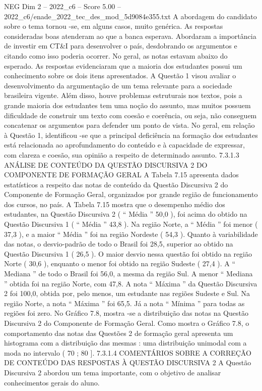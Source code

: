 \begin{textsample}{NEG Dim 2 – 2022\_c6 – Score 5.00 – 2022\_c6/enade\_2022\_tec\_des\_mod\_5d9084e355.txt}
A abordagem do candidato sobre o tema tornou -se, em alguns casos, muito genérica.
As respostas consideradas boas atenderam ao que a banca esperava.
Abordaram a importância de investir em CT\&I para desenvolver o país, desdobrando os argumentos e citando como isso poderia ocorrer.
No geral, as notas estavam abaixo do esperado.
As respostas evidenciaram que a maioria dos estudantes possui um conhecimento sobre os dois itens apresentados.
A Questão 1 visou avaliar o desenvolvimento da argumentação de um tema relevante para a sociedade brasileira vigente.
Além disso, houve problemas estruturais nos textos, pois a grande maioria dos estudantes tem uma noção do assunto, mas muitos possuem dificuldade de construir um texto com coesão e coerência, ou seja, não conseguem concatenar os argumentos para defender um ponto de vista.
No geral, em relação à Questão 1, identificou -se que a principal deficiência na formação dos estudantes está relacionada ao aprofundamento do conteúdo e à capacidade de expressar, com clareza e coesão, sua opinião a respeito de determinado assunto. 7.3.1.3 ANÁLISE DE CONTEÚDO DA QUESTÃO DISCURSIVA 2 DO COMPONENTE DE FORMAÇÃO GERAL A Tabela 7.15 apresenta dados estatísticos a respeito das notas de conteúdo da Questão Discursiva 2 do Componente de Formação Geral, organizados por grande região de funcionamento dos cursos, no país.
A Tabela 7.15 mostra que o desempenho médio dos estudantes, na Questão Discursiva 2 ( “ Média ” 50,0 ), foi acima do obtido na Questão Discursiva 1 ( “ Média ” 43,8 ).
Na região Norte, a “ Média ” foi menor ( 37,3 ), e a maior “ Média ” foi na região Nordeste ( 54,3 ).
Quanto à variabilidade das notas, o desvio-padrão de todo o Brasil foi 28,5, superior ao obtido na Questão Discursiva 1 ( 26,5 ).
O maior desvio nessa questão foi obtido na região Norte ( 30,6 ), enquanto o menor foi obtido na região Sudeste ( 27,4 ).
A “ Mediana ” de todo o Brasil foi 56,0, a mesma da região Sul.
A menor “ Mediana ” obtida foi na região Norte, com 47,8.
A nota “ Máxima ” da Questão Discursiva 2 foi 100,0, obtida por, pelo menos, um estudante nas regiões Sudeste e Sul.
Na região Norte, a nota “ Máxima ” foi 65,5.
Já a nota “ Mínima ” para todas as regiões foi zero.
No Gráfico 7.8, mostra -se a distribuição das notas na Questão Discursiva 2 do Componente de Formação Geral.
Como mostra o Gráfico 7.8, o comportamento das notas das Questões 2 de formação geral apresenta um histograma com a distribuição das mesmas : uma distribuição unimodal com a moda no intervalo ( 70 ; 80 ]. 7.3.1.4 COMENTÁRIOS SOBRE A CORREÇÃO DE CONTEÚDO DAS RESPOSTAS À QUESTÃO DISCURSIVA 2 A Questão Discursiva 2 abordou um tema importante, com o objetivo de analisar conhecimentos gerais do aluno.

\end{textsample}
